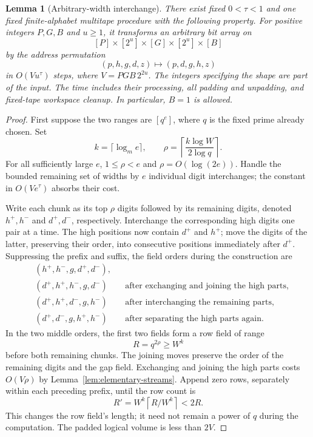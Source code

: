 \documentclass[11pt]{article}
\newtheorem{lemma}[theorem]{Lemma}
\theoremstyle{definition}
\begin{document}
\begin{lemma}[Arbitrary-width interchange]
\label{lem:chunk-swap}
There exist fixed $0<\tau<1$ and one fixed finite-alphabet multitape
procedure with the following property.  For positive integers $P,G,B$
and $u\ge1$, it transforms an arbitrary bit array on
\[
 [P]\times[2^u]\times[G]\times[2^u]\times[B]
\]
by the address permutation
\[
 (p,h,g,d,z)\longmapsto(p,d,g,h,z)
\]
in $O(Vu^\tau)$ steps, where $V=PG B\,2^{2u}$.
The integers specifying the shape are part of the input.  The time
includes their processing, all padding and unpadding, and fixed-tape
workspace cleanup.  In particular, $B=1$ is allowed.
\end{lemma}

\begin{proof}
First suppose the two ranges are $[q^e]$, where $q$ is the fixed prime
already chosen.  Set
\[
 k=\lceil\log_m e\rceil,\qquad
 \rho=\left\lceil\frac{k\log W}{2\log q}\right\rceil.
\]
For all sufficiently large $e$, $1\le\rho<e$ and $\rho=O(\log(2e))$.
Handle the bounded remaining set of widths by $e$ individual digit
interchanges; the constant in $O(Ve^\tau)$ absorbs their cost.

Write each chunk as its top $\rho$ digits followed by its remaining
digits, denoted $h^+,h^-$ and $d^+,d^-$, respectively.  Interchange
the corresponding high digits one pair at a time.  The high positions
now contain $d^+$ and $h^+$; move the digits of the latter, preserving
their order, into consecutive positions immediately after $d^+$.
Suppressing the prefix and suffix, the field orders during the construction are
\[
\begin{aligned}
 &(h^+,h^-,g,d^+,d^-),\\
 &(d^+,h^+,h^-,g,d^-)
       &&\text{after exchanging and joining the high parts},\\
 &(d^+,h^+,d^-,g,h^-)
       &&\text{after interchanging the remaining parts},\\
 &(d^+,d^-,g,h^+,h^-)
       &&\text{after separating the high parts again}.
\end{aligned}
\]
In the two middle orders, the first two fields form a row field of range
\[
 R=q^{2\rho}\ge W^k
\]
before both remaining chunks.  The joining moves preserve the order of
the remaining digits and the gap field.  Exchanging and joining the high
parts costs $O(V\rho)$ by
Lemma~\ref{lem:elementary-streams}.  Append zero rows, separately within
each preceding prefix, until the row count is
\[
 R'=W^k\left\lceil R/W^k\right\rceil<2R.
\]
This changes the row field's length; it need not remain a power of $q$
during the computation.  The padded logical volume is less than $2V$.


\end{proof}
\end{document}
